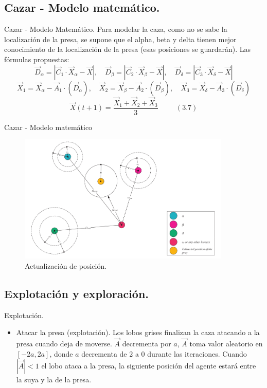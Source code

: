 \documentclass[a4paper,11pt]{beamer}
\begin{document}
\subsection{Cazar - Modelo matemático.}

\begin{frame}{Cazar - Modelo Matemático.}
	Para modelar la caza, como no se sabe la localización de la presa, se supone que el alpha, beta y delta tienen mejor conocimiento de la localización de la presa (esas posiciones se guardarán). Las fórmulas propuestas:
	$$\vec{D}_{\alpha} = |\vec{C}_1\cdot \vec{X}_{\alpha} - \vec{X}|, \quad \vec{D}_{\beta} = | \vec{C}_2\cdot \vec{X}_{\beta}-\vec{X}|, \quad \vec{D}_{\delta} = |\vec{C}_3\cdot \vec{X}_{\delta} - \vec{X}|$$
	$$\vec{X}_1 = \vec{X}_{\alpha} - \vec{A}_1 \cdot (\vec{D}_{\alpha}), \quad \vec{X}_2 = \vec{X}_{\beta} - \vec{A}_2 \cdot (\vec{D}_{\beta}), \quad \vec{X}_3=\vec{X}_{\delta} - \vec{A}_3 \cdot (\vec{D}_{\delta})$$
	$$\vec{X} (t+1) = \frac{\vec{X}_1 + \vec{X}_2 + \vec{X}_3}{3} \quad \quad \ \ (3.7)$$

\end{frame}




\begin{frame}{Cazar - Modelo matemático}
     \begin{figure}[H]
		\centering
		\includegraphics[width=0.9\textwidth]{images/omega_movement.png}
		\caption{Actualización de posición.}
	\end{figure}
\end{frame}

\subsection{Explotación y exploración.}

\begin{frame}{Explotación.}
	\begin{itemize}
		\item Atacar la presa (explotación). Los lobos grises finalizan la caza atacando a la presa cuando deja de moverse. $\vec{A}$ decrementa por $a$, $\vec{A}$ toma valor aleatorio en $[-2a, 2a]$, donde $a$ decrementa de 2 a 0 durante las iteraciones. Cuando $|\vec{A}|<1$ el lobo ataca a la presa, la siguiente posición del agente estará entre la suya y la de la presa.
	\end{itemize}

\end{frame}
\end{document}
